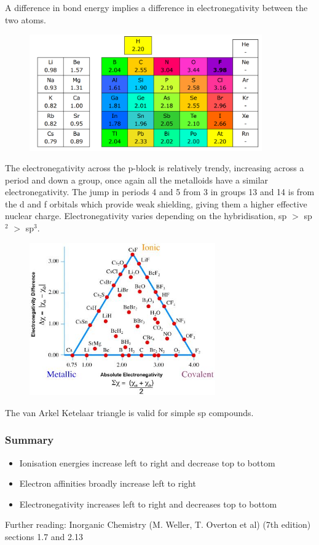 \documentclass{article}
\begin{document}
    A difference in bond energy implies a difference in electronegativity between the two atoms.
    \begin{figure}[h]
        \centering
        \includegraphics[width=10cm]{pauling.png}
    \end{figure}

    The electronegativity across the p-block is relatively trendy, increasing across a period and down a group,
    once again all the metalloids have a similar electronegativity. The jump in periods 4 and 5 from 3 in groups
    13 and 14 is from the d and f orbitals which provide weak shielding, giving them a higher effective nuclear 
    charge. Electronegativity varies depending on the hybridisation, sp \(>\) sp \(^2\) \(>\) sp\(^3\).
    \begin{figure}[h]
        \centering
        \includegraphics[width=8cm]{triangle.jpg}
    \end{figure}
    The van Arkel Ketelaar triangle is valid for simple sp compounds. 

    \subsubsection{Summary}
    \begin{itemize}
        \item Ionisation energies increase left to right and decrease top to bottom
        \item Electron affinities broadly increase left to right
        \item Electronegativity increases left to right and decreases top to bottom
    \end{itemize}
    Further reading: Inorganic Chemistry (M. Weller, T. Overton et al) (7th edition) sections 1.7 and 2.13
    \newpage
\end{document}
